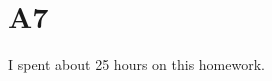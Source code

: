 \documentclass{article}
\begin{document}
\section*{A7}

\vfill
\begin{center}
    I spent about 25 hours on this homework.
\end{center}
\vfill
\end{document}
